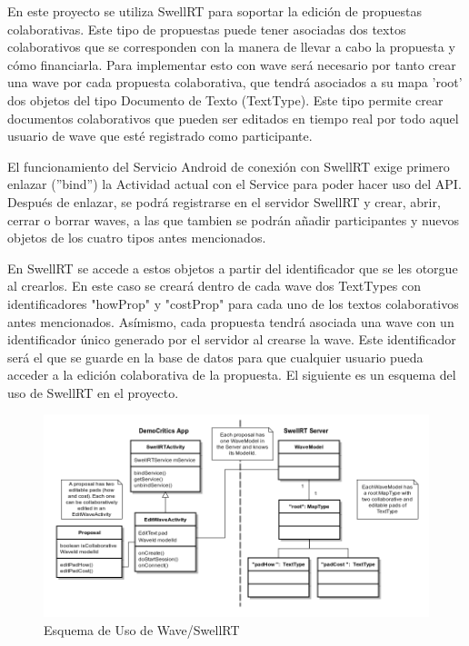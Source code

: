 		En este proyecto se utiliza SwellRT para soportar la edición de propuestas colaborativas. Este tipo de propuestas puede tener asociadas dos textos colaborativos que se corresponden con la manera de llevar a cabo la propuesta y cómo financiarla. Para implementar esto con wave será necesario por tanto crear una wave por cada propuesta colaborativa, que tendrá asociados a su mapa 'root' dos objetos del tipo Documento de Texto (TextType). Este tipo permite crear documentos colaborativos que pueden ser editados en tiempo real por todo aquel usuario de wave que esté registrado como participante. 
		
		El funcionamiento del Servicio Android de conexión con SwellRT exige primero enlazar (''bind'') la Actividad actual con el Service para poder hacer uso del API. Después de enlazar, se podrá registrarse en el servidor SwellRT y crear, abrir, cerrar o borrar waves, a las que tambien se podrán añadir participantes y nuevos objetos de los cuatro tipos antes mencionados. 
		
		En SwellRT se accede a estos objetos a partir del identificador que se les otorgue al crearlos. En este caso se creará dentro de cada wave dos TextTypes con identificadores "howProp" y "costProp" para cada uno de los textos colaborativos antes mencionados. Asímismo, cada propuesta tendrá asociada una wave con un identificador único generado por el servidor al crearse la wave. Este identificador será el que se guarde en la base de datos para que cualquier usuario pueda acceder a la edición colaborativa de la propuesta. El siguiente es un esquema del uso de SwellRT en el proyecto.
		
	\begin{figure}[H]
	  \centering
	    \includegraphics[keepaspectratio, scale=0.5]{Media/Diagrams/collaborativeProposalDiagram.png}
	  \caption{Esquema de Uso de Wave/SwellRT}
	  \label{fig:diagramUseSwellRT}
	\end{figure}	
			
